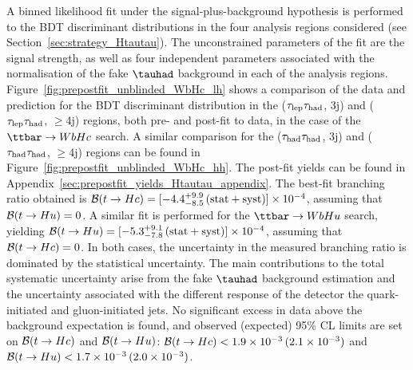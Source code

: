 A binned likelihood fit under the signal-plus-background hypothesis is performed to the BDT discriminant distributions in the four 
analysis regions considered (see Section~\ref{sec:strategy_Htautau}). The unconstrained parameters of the fit are the signal 
strength, as well as four independent parameters associated with the normalisation of the fake $\tauhad$ background in each of the analysis regions. 
Figure~\ref{fig:prepostfit_unblinded_WbHc_lh} shows a comparison of the data and prediction for the BDT discriminant distribution in
the ($\tau_{\mathrm{lep}} \tau_{\mathrm{had}}$, 3j) and ($\tau_{\mathrm{lep}} \tau_{\mathrm{had}}$, $\geq$4j) regions, both pre- and post-fit to data, in the case of the $\Hc$ search.  
A similar comparison for the ($\tau_{\mathrm{had}} \tau_{\mathrm{had}}$, 3j) and ($\tau_{\mathrm{had}} \tau_{\mathrm{had}}$, $\geq$4j) regions can be found in Figure~\ref{fig:prepostfit_unblinded_WbHc_hh}.
The post-fit yields can be found in Appendix~\ref{sec:prepostfit_yields_Htautau_appendix}.
The best-fit branching ratio obtained is $\mathcal{B}(t\to Hc)=[-4.4^{+9.9}_{-8.5}\,(\mathrm{stat+syst})] \times 10^{-4}$, assuming that $\mathcal{B}(t\to Hu)=0$. 
A similar fit is performed for the $\Hu$ search, yielding $\mathcal{B}(t\to Hu)=[-5.3^{+9.1}_{-7.8}\,(\mathrm{stat+syst})] \times 10^{-4}$,
assuming that $\mathcal{B}(t\to Hc)=0$. In both cases, the uncertainty in the measured branching ratio is dominated by the statistical uncertainty.
The main contributions to the total systematic uncertainty arise from the fake $\tauhad$ background estimation and the uncertainty associated
with the different response of the detector the quark-initiated and gluon-initiated jets.
No significant excess in data above the background expectation is found, 
and observed (expected) 95\% CL limits are set on $\mathcal{B}(t\to Hc)$ and $\mathcal{B}(t\to Hu)$:
$\mathcal{B}(t\to Hc)<1.9 \times 10^{-3}\,(2.1 \times 10^{-3})$ and $\mathcal{B}(t\to Hu)<1.7 \times 10^{-3}\,(2.0 \times 10^{-3})$.

